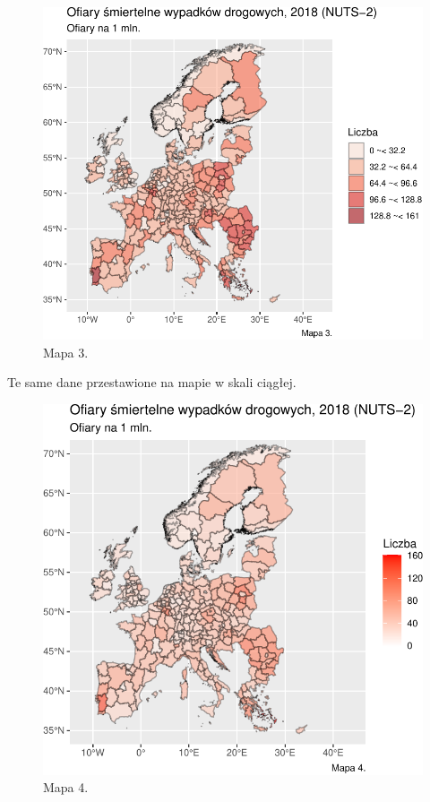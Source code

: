 \documentclass[
]{article}
\begin{document}
\begin{figure}

\includegraphics{raport_wypadki_files/figure-latex/unnamed-chunk-23-1} \hfill{}

\caption{Mapa 3.}\label{fig:unnamed-chunk-23}
\end{figure}

Te same dane przestawione na mapie w skali ciągłej.

\begin{figure}

\includegraphics{raport_wypadki_files/figure-latex/unnamed-chunk-24-1} \hfill{}

\caption{Mapa 4.}\label{fig:unnamed-chunk-24}
\end{figure}
\end{document}
